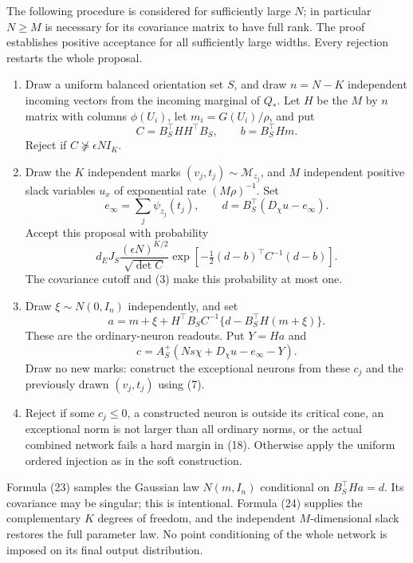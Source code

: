 The following procedure is considered for sufficiently large $N$; in
particular $N\ge M$ is necessary for its covariance matrix to have full
rank. The proof establishes positive acceptance for all sufficiently large
widths. Every rejection restarts the whole proposal.
\begin{enumerate}
\item Draw a uniform balanced orientation set $S$, and draw $n=N-K$
independent incoming vectors from the incoming marginal of $Q_*$.
Let $H$ be the $M$ by $n$ matrix with columns $\phi(U_i)$, let
$m_i=G(U_i)/\rho$, and put
\[
 C=B_S^\top HH^\top B_S,\qquad b=B_S^\top Hm.
\]
Reject if $C\not\succeq\epsilon N I_K$.
\item Draw the $K$ independent marks $(v_j,t_j)\sim\mathcal M_{z_j}$,
and $M$ independent positive slack variables $u_x$ of exponential
rate $(M\rho)^{-1}$. Set
\[
 e_\infty=\sum_j\psi_{z_j}(t_j),\qquad
 d=B_S^\top(D_\chi u-e_\infty).
\]
Accept this proposal with probability
\[
 d_EJ_S\frac{(\epsilon N)^{K/2}}{\sqrt{\det C}}
        \exp[-\tfrac12(d-b)^\top C^{-1}(d-b)].           \tag{22}
\]
The covariance cutoff and (3) make this probability at most one.
\item Draw $\xi\sim N(0,I_n)$ independently, and set
\[
 a=m+\xi+H^\top B_SC^{-1}\{d-B_S^\top H(m+\xi)\}.
 \tag{23}
\]
These are the ordinary-neuron readouts. Put $Y=Ha$ and
\[
              c=A_S^+(Ns\chi+D_\chi u-e_\infty-Y).      \tag{24}
\]
Draw no new marks: construct the exceptional neurons from these $c_j$
and the previously drawn $(v_j,t_j)$ using (7).
\item Reject if some $c_j\le0$, a constructed neuron is outside its
critical cone, an exceptional norm is not larger than all ordinary
norms, or the actual combined network fails a hard margin in (18).
Otherwise apply the uniform ordered injection as in the soft construction.
\end{enumerate}
Formula (23) samples the Gaussian law $N(m,I_n)$ conditional on
$B_S^\top Ha=d$. Its covariance may be singular; this is intentional.
Formula (24) supplies the complementary $K$ degrees of freedom, and
the independent $M$-dimensional slack restores the full parameter
law. No point conditioning of the whole network is imposed on its
final output distribution.

